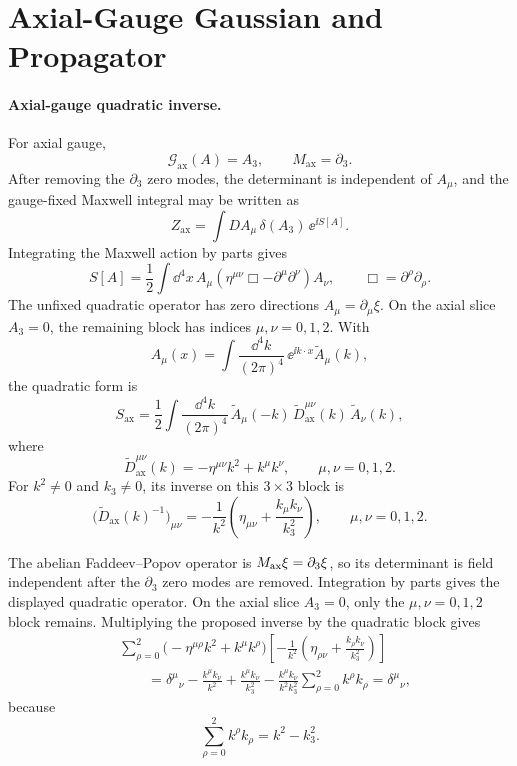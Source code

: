 \section{Axial-Gauge Gaussian and Propagator}

\paragraph{Axial-gauge quadratic inverse.}
For axial gauge,
\[
  \mathcal G_{\mathrm{ax}}(A)=A_3,
  \qquad
  M_{\mathrm{ax}}=\partial_3 .
\]
After removing the \(\partial_3\) zero modes, the determinant is independent
of \(A_\mu\), and the gauge-fixed Maxwell integral may be written as
\[
  Z_{\mathrm{ax}}
  =
  \int DA_\mu\,\delta(A_3)\,\ee^{\ii S[A]} .
\]
Integrating the Maxwell action by parts gives
\[
  S[A]
  =
  \frac12\int\dd^4x\,
  A_\mu
  \left(\eta^{\mu\nu}\Box-\partial^\mu\partial^\nu\right)
  A_\nu ,
  \qquad
  \Box=\partial^\rho\partial_\rho .
\]
The unfixed quadratic operator has zero directions \(A_\mu=\partial_\mu\xi\).
On the axial slice \(A_3=0\), the remaining block has indices
\(\mu,\nu=0,1,2\). With
\[
  A_\mu(x)
  =
  \int\frac{\dd^4k}{(2\pi)^4}\,
  \ee^{\ii k\cdot x}\widetilde A_\mu(k),
\]
the quadratic form is
\[
  S_{\mathrm{ax}}
  =
  \frac12
  \int\frac{\dd^4k}{(2\pi)^4}\,
  \widetilde A_\mu(-k)\,
  \widetilde D_{\mathrm{ax}}^{\mu\nu}(k)\,
  \widetilde A_\nu(k),
\]
where
\[
  \widetilde D_{\mathrm{ax}}^{\mu\nu}(k)
  =
  -\eta^{\mu\nu}k^2+k^\mu k^\nu,
  \qquad
  \mu,\nu=0,1,2.
\]
For \(k^2\ne0\) and \(k_3\ne0\), its inverse on this \(3\times3\) block is
\[
  \bigl(\widetilde D_{\mathrm{ax}}(k)^{-1}\bigr)_{\mu\nu}
  =
  -\frac{1}{k^2}
  \left(
    \eta_{\mu\nu}+\frac{k_\mu k_\nu}{k_3^2}
  \right),
  \qquad
  \mu,\nu=0,1,2.
\]

The abelian Faddeev--Popov operator is
\(M_{\rm ax}\xi=\partial_3\xi\), so its determinant is field independent
after the \(\partial_3\) zero modes are removed.  Integration by parts gives
the displayed quadratic operator.  On the axial slice \(A_3=0\), only the
\(\mu,\nu=0,1,2\) block remains.  Multiplying the proposed inverse by the
quadratic block gives
\[
\begin{aligned}
  &\sum_{\rho=0}^2
  \bigl(-\eta^{\mu\rho}k^2+k^\mu k^\rho\bigr)
  \left[
    -\frac1{k^2}
    \left(\eta_{\rho\nu}+\frac{k_\rho k_\nu}{k_3^2}\right)
  \right]  \\
  &\qquad
  =
  \delta^\mu{}_\nu
  -
  \frac{k^\mu k_\nu}{k^2}
  +
  \frac{k^\mu k_\nu}{k_3^2}
  -
  \frac{k^\mu k_\nu}{k^2k_3^2}
  \sum_{\rho=0}^2 k^\rho k_\rho
  =
  \delta^\mu{}_\nu,
\end{aligned}
\]
because
\[
  \sum_{\rho=0}^2 k^\rho k_\rho=k^2-k_3^2 .
\]

